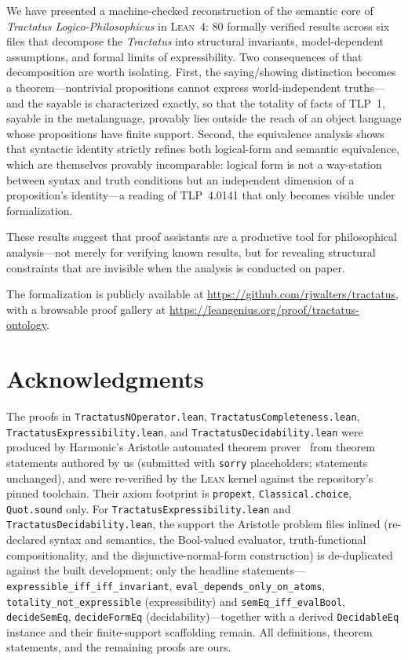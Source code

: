 \documentclass[jsl,bibother]{asl}
\theoremstyle{definition}
\theoremstyle{remark}
\newcommand{\Lean}{\textsc{Lean}}
\begin{document}
We have presented a machine-checked reconstruction of the
semantic core of \emph{Tractatus Logico-Philosophicus} in
\Lean~4: 80 formally verified results across six files that
decompose the \emph{Tractatus} into structural invariants,
model-dependent assumptions, and formal limits of
expressibility.  Two consequences of that decomposition are
worth isolating.  First, the saying/showing distinction becomes
a theorem---nontrivial propositions cannot express
world-independent truths---and the sayable is characterized
exactly, so that the totality of facts of TLP~1, sayable in the
metalanguage, provably lies outside the reach of an object
language whose propositions have finite support.  Second, the
equivalence analysis shows that syntactic identity strictly
refines both logical-form and semantic equivalence, which are
themselves provably incomparable: logical form is not a
way-station between syntax and truth conditions but an
independent dimension of a proposition's identity---a reading of
TLP~4.0141 that only becomes visible under formalization.

These results suggest that proof assistants are a productive tool
for philosophical analysis---not merely for verifying known
results, but for revealing structural constraints that are
invisible when the analysis is conducted on paper.

The formalization is publicly available at
\url{https://github.com/rjwalters/tractatus}, with a
browsable proof gallery at
\url{https://leangenius.org/proof/tractatus-ontology}.

\section*{Acknowledgments}

The proofs in \texttt{TractatusNOperator.lean},
\texttt{TractatusCompleteness.lean},
\texttt{TractatusExpressibility.lean}, and
\texttt{TractatusDecidability.lean} were produced by Harmonic's
Aristotle automated theorem prover~\cite{harmonic2026} from
theorem statements authored by us (submitted with \texttt{sorry}
placeholders; statements unchanged), and were re-verified by the
\Lean{} kernel against the repository's pinned toolchain.  Their
axiom footprint is \texttt{propext}, \texttt{Classical.choice},
\texttt{Quot.sound} only.  For
\texttt{TractatusExpressibility.lean} and
\texttt{TractatusDecidability.lean}, the support the Aristotle
problem files inlined (re-declared syntax and semantics, the
Bool-valued evaluator, truth-functional compositionality, and the
disjunctive-normal-form construction) is de-duplicated against the
built development; only the headline
statements---\texttt{expressible\_iff\_iff\_invariant},
\texttt{eval\_depends\_only\_on\_atoms},
\texttt{totality\_not\_expressible} (expressibility) and
\texttt{semEq\_iff\_evalBool}, \texttt{decideSemEq},
\texttt{decideFormEq} (decidability)---together with a derived
\texttt{DecidableEq} instance and their finite-support
scaffolding remain.  All definitions, theorem statements, and the
remaining proofs are ours.
\end{document}
